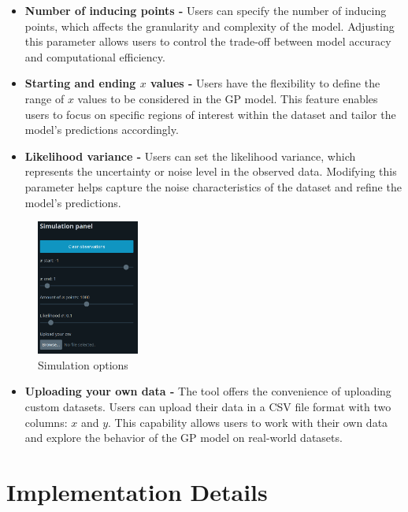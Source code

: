 \documentclass[preprint,journal]{vgtc}       %
\begin{document}
  \begin{itemize}
    \item \textbf{Number of inducing points -} Users can specify the number of inducing points, which affects the granularity and complexity of the model. Adjusting this parameter allows users to control the trade-off between model accuracy and computational efficiency.
    \item \textbf{Starting and ending $x$ values -} Users have the flexibility to define the range of $x$ values to be considered in the GP model. This feature enables users to focus on specific regions of interest within the dataset and tailor the model's predictions accordingly.
    \item \textbf{Likelihood variance -} Users can set the likelihood variance, which represents the uncertainty or noise level in the observed data. Modifying this parameter helps capture the noise characteristics of the dataset and refine the model's predictions.
  \end{itemize}

\begin{figure}[H]
  \centering
  \includegraphics[width=0.30\textwidth]{../imgs/simulation.png}
  \caption{Simulation options}
\end{figure}


\begin{itemize}
  \item \textbf{Uploading your own data -} The tool offers the convenience of uploading custom datasets. Users can upload their data in a CSV file format with two columns: $x$ and $y$. This capability allows users to work with their own data and explore the behavior of the GP model on real-world datasets.
\end{itemize}

\section{Implementation Details}
\end{document}
